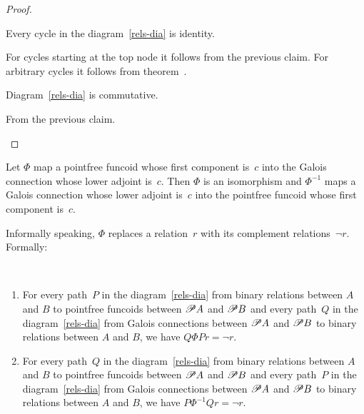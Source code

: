 \begin{proof}
\begin{claim}
Every cycle in the diagram~\ref{rels-dia} is identity.
\end{claim}
\begin{claimproof}
For cycles starting at the top node it follows from the previous claim.
For arbitrary cycles it follows from theorem~.
\end{claimproof}

\begin{claim}
Diagram~\ref{rels-dia} is commutative.
\end{claim}
\begin{claimproof}
From the previous claim.
\end{claimproof}


\end{proof}

Let $\Phi$ map a pointfree funcoid whose first component is~$c$ into the Galois connection whose lower adjoint is~$c$.
Then $\Phi$ is an isomorphism  and
$\Phi^{-1}$ maps a Galois connection whose lower adjoint is~$c$ into the pointfree funcoid whose first component is~$c$.

Informally speaking, $\Phi$ replaces a relation~$r$ with its complement relations~$\lnot r$. Formally:

\begin{prop}
~
\begin{enumerate}
\item For every path~$P$ in the diagram~\ref{rels-dia} from binary relations between $A$ and $B$
to pointfree funcoids between $\mathscr{P} A$ and $\mathscr{P} B$
and every path~$Q$ in the diagram~\ref{rels-dia} from
Galois connections between $\mathscr{P} A$ and $\mathscr{P} B$
to binary relations between $A$ and $B$,
we have $Q\Phi P r = \lnot r$.

\item For every path~$Q$ in the diagram~\ref{rels-dia} from binary relations between $A$ and $B$
to pointfree funcoids between $\mathscr{P} A$ and $\mathscr{P} B$
and every path~$P$ in the diagram~\ref{rels-dia}
from Galois connections between $\mathscr{P} A$ and $\mathscr{P} B$
to binary relations between $A$ and $B$,
we have $P\Phi^{-1} Q r = \lnot r$.
\end{enumerate}
\end{prop}

